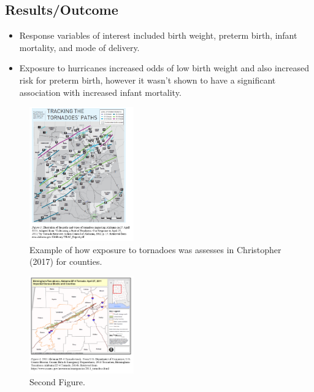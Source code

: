 \documentclass[
]{article}
\providecommand{\tightlist}{%
  \setlength{\itemsep}{0pt}\setlength{\parskip}{0pt}}
\begin{document}
\hypertarget{resultsoutcome-2}{%
\subsection{Results/Outcome}\label{resultsoutcome-2}}

\begin{itemize}
\tightlist
\item
  Response variables of interest included birth weight, preterm birth,
  infant mortality, and mode of delivery.
\item
  Exposure to hurricanes increased odds of low birth weight and also
  increased risk for preterm birth, however it wasn't shown to have a
  significant association with increased infant mortality.
\end{itemize}

\begin{figure}

{\centering \includegraphics[width=0.4\textwidth]{figures/Tracking_The_Tornadoes_Paths_in_Alabama} 

}

\caption{Example of how exposure to tornadoes was assesses in Christopher (2017) for counties.}\label{fig:unnamed-chunk-1}
\end{figure}

\begin{figure}

{\centering \includegraphics[width=0.4\textwidth]{figures/Birmingham_Tuscaloosa_Tornado_Track} 

}

\caption{Second Figure.}\label{fig:unnamed-chunk-2}
\end{figure}
\end{document}
